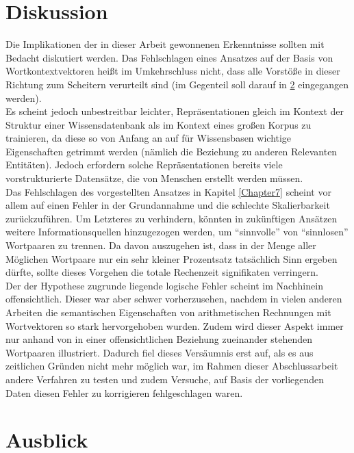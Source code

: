 \section{Diskussion}

Die Implikationen der in dieser Arbeit gewonnenen Erkenntnisse sollten mit Bedacht diskutiert werden. Das Fehlschlagen
eines Ansatzes auf der Basis von Wortkontextvektoren heißt im Umkehrschluss nicht, dass alle Vorstöße in dieser
Richtung zum Scheitern verurteilt sind (im Gegenteil soll darauf in \ref{sec:fazit-ausblick} eingegangen werden).\\
Es scheint jedoch unbestreitbar leichter, Repräsentationen gleich im Kontext der Struktur einer Wissensdatenbank als im
Kontext eines großen Korpus zu trainieren, da diese so von Anfang an auf für Wissensbasen wichtige Eigenschaften getrimmt werden
(nämlich die Beziehung zu anderen Relevanten Entitäten). Jedoch erfordern solche Repräsentationen bereits viele
vorstrukturierte Datensätze, die von Menschen erstellt werden müssen.\\

Das Fehlschlagen des vorgestellten Ansatzes in Kapitel \ref{Chapter7} scheint vor allem auf einen Fehler in der
Grundannahme und die schlechte Skalierbarkeit zurückzuführen. Um Letzteres zu verhindern, könnten in zukünftigen Ansätzen
weitere Informationsquellen hinzugezogen werden, um ``sinnvolle'' von ``sinnlosen'' Wortpaaren zu trennen. Da davon
auszugehen ist, dass in der Menge aller Möglichen Wortpaare nur ein sehr kleiner Prozentsatz tatsächlich Sinn ergeben
dürfte, sollte dieses Vorgehen die totale Rechenzeit signifikaten verringern.\\
Der der Hypothese zugrunde liegende logische Fehler scheint im Nachhinein offensichtlich. Dieser war aber schwer
vorherzusehen, nachdem in vielen anderen Arbeiten die semantischen Eigenschaften von arithmetischen Rechnungen mit
Wortvektoren so stark hervorgehoben wurden. Zudem wird dieser Aspekt immer nur anhand von in einer offensichtlichen
Beziehung zueinander stehenden Wortpaaren illustriert. Dadurch fiel dieses Versäumnis erst auf, als es aus zeitlichen Gründen
nicht mehr möglich war, im Rahmen dieser Abschlussarbeit andere Verfahren zu testen und zudem Versuche, auf Basis der
vorliegenden Daten diesen Fehler zu korrigieren fehlgeschlagen waren.

\section{Ausblick}\label{sec:fazit-ausblick}

